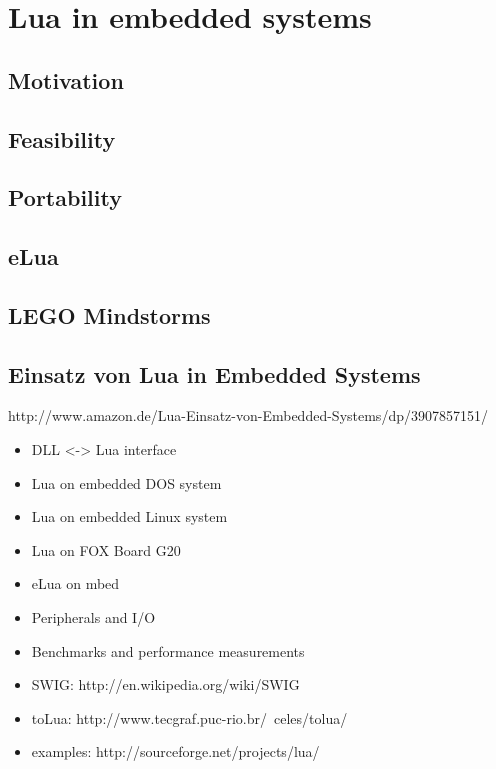 \section{Lua in embedded systems}
\label{ch:lua_in_embedded}

\subsection{Motivation}


\subsection{Feasibility}


\subsection{Portability}

\subsection{eLua}

\subsection{LEGO Mindstorms}
\cite{chapter:porting_lua_microcontroller}

\subsection{Einsatz von Lua in Embedded Systems}
http://www.amazon.de/Lua-Einsatz-von-Embedded-Systems/dp/3907857151/

\begin{itemize}
	\item DLL <-> Lua interface
	\item Lua on embedded DOS system
	\item Lua on embedded Linux system
	\item Lua on FOX Board G20
	\item eLua on mbed
	\item Peripherals and I/O
	\item Benchmarks and performance measurements
	\item SWIG: http://en.wikipedia.org/wiki/SWIG
	\item toLua: http://www.tecgraf.puc-rio.br/~celes/tolua/
	\item examples: http://sourceforge.net/projects/lua/
\end{itemize}

